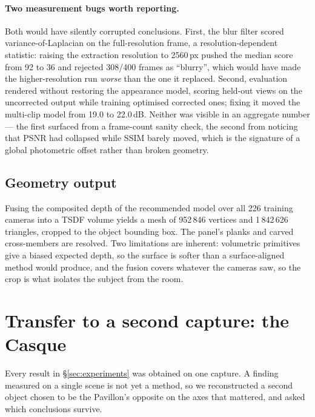\paragraph{Two measurement bugs worth reporting.}
Both would have silently corrupted conclusions. First, the blur filter scored
variance-of-Laplacian on the full-resolution frame, a resolution-dependent
statistic: raising the extraction resolution to 2560\,px pushed the median score
from 92 to 36 and rejected 308/400 frames as ``blurry'', which would have made the
higher-resolution run \emph{worse} than the one it replaced. Second, evaluation
rendered without restoring the appearance model, scoring held-out views on the
uncorrected output while training optimised corrected ones; fixing it moved the
multi-clip model from 19.0 to 22.0\,dB. Neither was visible in an aggregate number
--- the first surfaced from a frame-count sanity check, the second from noticing that
PSNR had collapsed while SSIM barely moved, which is the signature of a global
photometric offset rather than broken geometry.

\subsection{Geometry output}

Fusing the composited depth of the recommended model over all 226 training cameras
into a TSDF volume \cite{curless1996tsdf} yields a mesh of 952\,846 vertices and
1\,842\,626 triangles, cropped to the object bounding box. The panel's planks and
carved cross-members are resolved. Two limitations are inherent: volumetric
primitives give a biased expected depth, so the surface is softer than a
surface-aligned method would produce, and the fusion covers whatever the cameras
saw, so the crop is what isolates the subject from the room.

\section{Transfer to a second capture: the Casque}
\label{sec:casque}

Every result in \S\ref{sec:experiments} was obtained on one capture. A finding measured
on a single scene is not yet a method, so we reconstructed a second object chosen to be
the Pavillon's opposite on the axes that mattered, and asked which conclusions survive.

